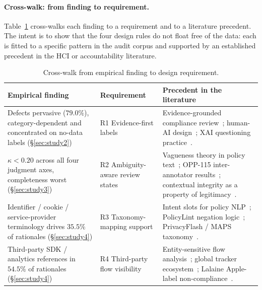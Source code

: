 \documentclass[11pt,a4paper]{article}
\newcommand{\dgrule}[1]{\textsf{R#1}}
\begin{document}
\paragraph{Cross-walk: from finding to requirement.}
Table~\ref{tab:findings-to-req} cross-walks each finding to a
requirement and to a literature precedent. The intent is to show that
the four design rules do not float free of the data: each is fitted
to a specific pattern in the audit corpus and supported by an
established precedent in the HCI or accountability literature.

\begin{table}[t]
\centering\small
\caption{Cross-walk from empirical finding to design requirement.}
\label{tab:findings-to-req}
\begin{tabular}{p{}p{}p{}}
\toprule
Empirical finding & Requirement & Precedent in the literature \\
\midrule
Defects pervasive ($79.0\%$), category-dependent and concentrated on
no-data labels (\S\ref{sec:study2})
& \dgrule{1} Evidence-first labels
& Evidence-grounded compliance review~\citep{lippi2019claudette};
  human-AI design~\citep{amershi2019guidelines,cai2019hello};
  XAI questioning practice~\citep{liao2020questioning}.
\\[2pt]
$\kappa<0.20$ across all four judgment axes, completeness worst
(\S\ref{sec:study3})
& \dgrule{2} Ambiguity-aware review states
& Vagueness theory in policy text~\citep{bhatia2016theory};
  OPP-115 inter-annotator results~\citep{wilson2016creation};
  contextual integrity as a property of legitimacy~\citep{nissenbaum2004privacy}.
\\[2pt]
Identifier / cookie / service-provider terminology drives $35.5\%$ of
rationales (\S\ref{sec:study4})
& \dgrule{3} Taxonomy-mapping support
& Intent slots for policy NLP~\citep{ahmad2021intent};
  PolicyLint negation logic~\citep{andow2019policylint};
  PrivacyFlash / MAPS taxonomy~\citep{zimmeck2019maps}.
\\[2pt]
Third-party SDK / analytics references in $54.5\%$ of rationales
(\S\ref{sec:study4})
& \dgrule{4} Third-party flow visibility
& Entity-sensitive flow analysis~\citep{andow2020policheck};
  global tracker ecosystem~\citep{razaghpanah2018apps,englehardt2016online};
  Lalaine Apple-label non-compliance~\citep{xiao2023lalaine}.
\\
\bottomrule
\end{tabular}
\end{table}
\end{document}
